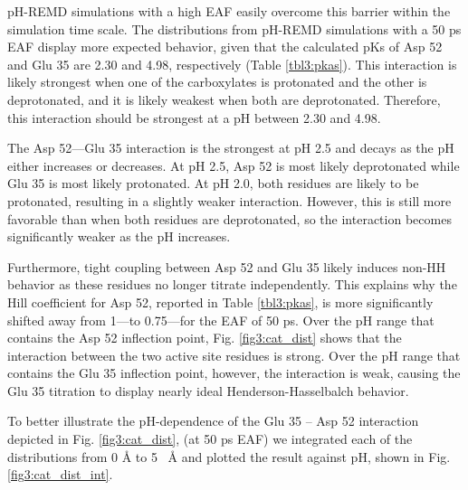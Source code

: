 pH-REMD simulations with a high EAF easily overcome this barrier within the
simulation time scale.  The distributions from pH-REMD simulations with a 50
ps EAF display more expected behavior, given that the calculated
pKs of Asp 52 and Glu 35 are 2.30 and 4.98, respectively
(Table \ref{tbl3:pkas}).  This interaction is likely strongest when one of the
carboxylates is protonated and the other is deprotonated, and it is likely
weakest when both are deprotonated.  Therefore, this interaction should be
strongest at a pH between 2.30 and 4.98.

The Asp 52---Glu 35 interaction is the strongest at pH 2.5 and decays as the pH
either increases or decreases.  At pH 2.5, Asp 52 is most likely deprotonated
while Glu 35 is most likely protonated.  At pH 2.0, both residues are likely to
be protonated, resulting in a slightly weaker interaction.  However, this is
still more favorable than when both residues are deprotonated, so the
interaction becomes significantly weaker as the pH increases.

Furthermore, tight coupling between Asp 52 and Glu 35 likely induces non-HH
behavior as these residues no longer titrate independently.  This explains why
the Hill coefficient for Asp 52, reported in Table \ref{tbl3:pkas}, is more
significantly shifted away from 1---to 0.75---for the EAF of 50 ps.
Over the pH range that contains the Asp 52 inflection point, Fig.
\ref{fig3:cat_dist} shows that the interaction between the two active site
residues is strong.  Over the pH range that contains the Glu 35 inflection
point, however, the interaction is weak, causing the Glu 35 titration to display
nearly ideal Henderson-Hasselbalch behavior.

To better illustrate the pH-dependence of the Glu 35 -- Asp 52 interaction
depicted in Fig. \ref{fig3:cat_dist}, (at 50 ps EAF) we integrated
each of the distributions from 0 \mbox{\normalfont \AA} to 5 \mbox{\normalfont
\AA} and plotted the result against pH, shown in Fig. \ref{fig3:cat_dist_int}.

